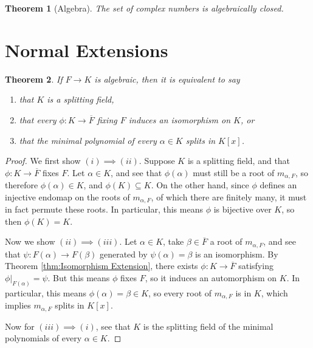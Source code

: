 \documentclass[
    parskip=half,
    toc=flat,
    toc=sectionentrydotfill,
]{scrartcl}  %
\theoremstyle{definition}
\theoremstyle{plain}
\newtheorem{theorem}{Theorem}[section]
\theoremstyle{remark}
\begin{document}
\begin{theorem}[Algebra]
    The set of complex numbers is algebraically closed.
\end{theorem}


\section{Normal Extensions}

\begin{theorem}
    If $F\to K$ is algebraic, then it is equivalent to say
    \begin{enumerate}
        \item that $K$ is a splitting field,
        \item that every $\phi:K\to\overline{F}$ fixing $F$ induces an isomorphism on $K$, or

        \item that the minimal polynomial of every $\alpha\in K$ splits in $K[x]$.
    \end{enumerate}
\end{theorem}

\begin{proof}
    We first show $(i)\implies(ii)$.
    Suppose $K$ is a splitting field, and that $\phi:K\to\overline{F}$ fixes $F$.
    Let $\alpha\in K$, and see that $\phi(\alpha)$ must still be a root of $m_{\alpha,F}$, so therefore
    $\phi(\alpha)\in K$, and $\phi(K)\subseteq K$.
    On the other hand, since $\phi$ defines an injective endomap on the roots of $m_{\alpha,F}$, of which there are
    finitely many, it must in fact permute these roots.
    In particular, this means $\phi$ is bijective over $K$, so then $\phi(K)=K$.

    Now we show $(ii)\implies(iii)$.
    Let $\alpha\in K$, take $\beta\in\overline{F}$ a root of $m_{\alpha,F}$, and see that $\psi:F(\alpha)\to F(\beta)$
    generated by $\psi(\alpha)=\beta$ is an isomorphism.
    By Theorem \ref{thm:Isomorphism Extension}, there exists $\phi:K\to\overline{F}$ satisfying
    $\phi\vert_{F(\alpha)}=\psi$.
    But this means $\phi$ fixes $F$, so it induces an automorphism on $K$.
    In particular, this means $\phi(\alpha)=\beta\in K$, so every root of $m_{\alpha,F}$ is in $K$, which implies
    $m_{\alpha,F}$ splits in $K[x]$.

    Now for $(iii)\implies(i)$, see that $K$ is the splitting field of the minimal polynomials of every
    $\alpha\in K$.
\end{proof}
\end{document}
